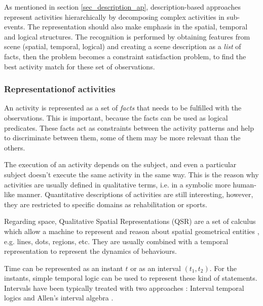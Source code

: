 As mentioned in section \ref{sec_description_ap}, description-based approaches represent activities hierarchically by decomposing complex activities in sub-events.
The representation should also make emphasis in the spatial, temporal and logical structures.
The recognition is performed by obtaining features from scene (spatial, temporal, logical) and creating a scene description as a \textit{list} of facts, then the problem becomes a constraint satisfaction problem, to find the best activity match for these set of observations. 

\subsubsection{Representationof activities}

An activity is represented as a set of \textit{facts} that needs to be fulfilled with the observations.
This is important, because the facts can be used as logical predicates.
These facts act as constraints between the activity patterns and help to discriminate between them, some of them may be more relevant than the others.

The execution of an activity depends on the subject, and even a particular subject doesn't execute the same activity in the same way.
This is the reason why activities are usually defined in qualitative terms, i.e. in a symbolic more human-like manner.
Quantitative descriptions of activities are still interesting, however, they are restricted to specific domains as rehabilitation or sports.

Regarding space, Qualitative Spatial Representations (QSR) are a set of calculus which allow a machine to represent and reason about spatial geometrical entities \citep{Cohn2008_QSRR}, e.g. lines, dots, regions, etc.
They are usually combined with a temporal representation to represent the dynamics of behaviours.

Time can be represented as an instant $t$ or as an interval $(t_1,t_2)$. 
For the instants, simple temporal logic can be used to represent these kind of statements. 
Intervals have been typically treated with two approaches \citep{Fisher2008_TempRepReas}: Interval temporal logics \citep{Moszkowski1983_RDC} and Allen's interval algebra \citep{Allen83_MaintainingKnowledgeTemporal}.


